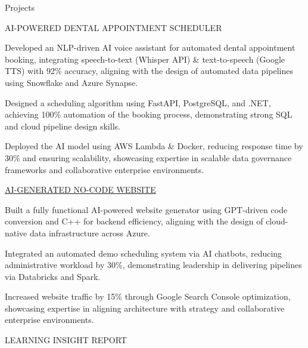 \documentclass{resume} %
\begin{document}
    \begin{rSection}{Projects}
                    \begin{rSubsection}
                                    {AI{-}POWERED DENTAL APPOINTMENT SCHEDULER}
                                {}{}{}
                                    \item Developed an NLP{-}driven AI voice assistant for automated dental appointment booking, integrating speech{-}to{-}text (Whisper API) \& text{-}to{-}speech (Google TTS) with 92\% accuracy, aligning with the design of automated data pipelines using Snowflake and Azure Synapse.
                                    \item Designed a scheduling algorithm using FastAPI, PostgreSQL, and .NET, achieving 100\% automation of the booking process, demonstrating strong SQL and cloud pipeline design skills.
                                    \item Deployed the AI model using AWS Lambda \& Docker, reducing response time by 30\% and ensuring scalability, showcasing expertise in scalable data governance frameworks and collaborative enterprise environments.
                            \end{rSubsection}
                    \begin{rSubsection}
                                    {\href{www.civaroai.com}{AI{-}GENERATED NO{-}CODE WEBSITE}}
                                {}{}{}
                                    \item Built a fully functional AI{-}powered website generator using GPT{-}driven code conversion and C++ for backend efficiency, aligning with the design of cloud{-}native data infrastructure across Azure.
                                    \item Integrated an automated demo scheduling system via AI chatbots, reducing administrative workload by 30\%, demonstrating leadership in delivering pipelines via Databricks and Spark.
                                    \item Increased website traffic by 15\% through Google Search Console optimization, showcasing expertise in aligning architecture with strategy and collaborative enterprise environments.
                            \end{rSubsection}
                    \begin{rSubsection}
                                    {LEARNING INSIGHT REPORT}

\end{rSubsection}
\end{rSection}
\end{document}
